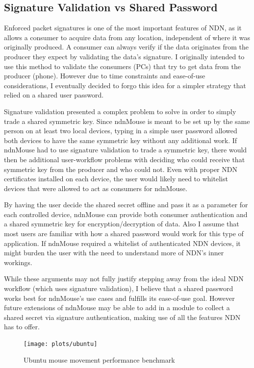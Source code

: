 \documentclass{sig-alternate}
\renewcommand\_{\textunderscore\allowbreak}  %
\begin{document}
\subsection{Signature Validation vs Shared Password}
\label{sec:sigval}
Enforced packet signatures is one of the most important features of NDN, as it allows a consumer to acquire data from any location, independent of where it was originally produced. A consumer can always verify if the data originates from the producer they expect by validating the data's signature. I originally intended to use this method to validate the consumers (PCs) that try to get data from the producer (phone). However due to time constraints and ease-of-use considerations, I eventually decided to forgo this idea for a simpler strategy that relied on a shared user password.

Signature validation presented a complex problem to solve in order to simply trade a shared symmetric key. Since ndnMouse is meant to be set up by the same person on at least two local devices, typing in a simple user password allowed both devices to have the same symmetric key without any additional work. If ndnMouse had to use signature validation to trade a symmetric key, there would then be additional user-workflow problems with deciding who could receive that symmetric key from the producer and who could not. Even with proper NDN certificates installed on each device, the user would likely need to whitelist devices that were allowed to act as consumers for ndnMouse.

By having the user decide the shared secret offline and pass it as a parameter for each controlled device, ndnMouse can provide both consumer authentication and a shared symmetric key for encryption/decryption of data. Also I assume that most users are familiar with how a shared password would work for this type of application. If ndnMouse required a whitelist of authenticated NDN devices, it might burden the user with the need to understand more of NDN's inner workings. 

While these arguments may not fully justify stepping away from the ideal NDN workflow (which uses signature validation), I believe that a shared password works best for ndnMouse's use cases and fulfills its ease-of-use goal. However future extensions of ndnMouse may be able to add in a module to collect a shared secret via signature authentication, making use of all the features NDN has to offer.

\begin{figure}[t]
	\centering
	\hypertarget{fig:ubuntuBenchmark}{}
	\texttt{[image: plots/ubuntu]}
	\caption{Ubuntu mouse movement performance benchmark}
\end{figure}
\end{document}
